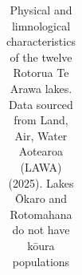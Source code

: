 \documentclass[
  12pt,
  a4paper,
]{scrbook}
\begin{document}
{

\begin{longtable}[]{@{}
  >{\raggedright\arraybackslash}p{}
  >{\raggedleft\arraybackslash}p{}
  >{\raggedleft\arraybackslash}p{}
  >{\raggedleft\arraybackslash}p{}
  >{\raggedleft\arraybackslash}p{}
  >{\raggedleft\arraybackslash}p{}
  >{\raggedleft\arraybackslash}p{}
  >{\raggedright\arraybackslash}p{}
  >{\raggedright\arraybackslash}p{}@{}}

\caption{\label{tbl-bop-lake-overview}Physical and limnological
characteristics of the twelve Rotorua Te Arawa lakes. Data sourced from
Land, Air, Water Aotearoa (LAWA) (2025). Lakes Ōkaro and Rotomahana do
not have kōura populations}

\tabularnewline


\end{longtable}}
\end{document}
